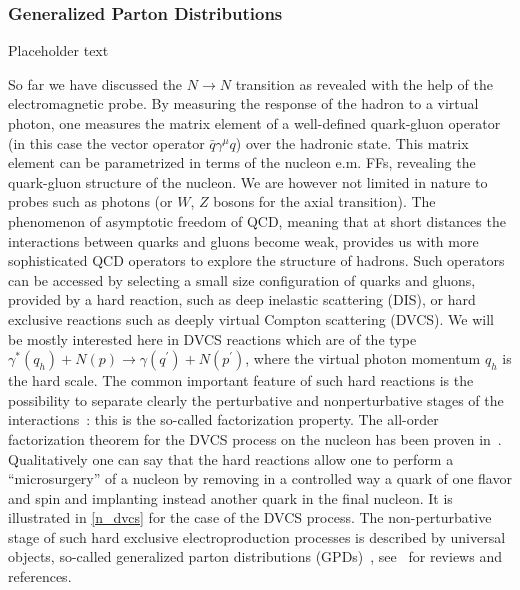 \subsubsection{Generalized Parton Distributions}
\label{subsubsec:gpd}


Placeholder text


So far we have discussed the $N \to N$ transition 
as revealed with the help of the electromagnetic probe. By measuring 
the response of the hadron to a virtual photon, one measures the matrix 
element of a  well-defined quark-gluon operator (in this case the vector 
operator $\bar q \gamma^\mu q$) over the hadronic state. This matrix element  
can be parametrized in terms of the nucleon e.m. FFs, 
revealing the quark-gluon structure of the nucleon. 
We are however not limited in nature to probes such as photons 
(or $W$, $Z$ bosons for the axial transition). The phenomenon of asymptotic 
freedom of QCD, meaning that at short distances the interactions between 
quarks and gluons become weak, provides us with more sophisticated 
QCD operators to explore the structure of hadrons. Such operators can 
be accessed by selecting a small size configuration of quarks and gluons, 
provided by a hard reaction, such as deep inelastic scattering (DIS), or 
hard exclusive reactions such as deeply virtual Compton scattering (DVCS).  
We will be mostly interested here in DVCS reactions which are of the type 
$\gamma^*(q_h) + N(p) \to \gamma(q^\prime) + N(p^\prime)$, where the 
virtual photon momentum $q_h$ is the hard scale. 
The common important feature of such hard reactions is the possibility
to separate clearly the perturbative and nonperturbative stages of
the interactions~: this is the so-called factorization property. 
\newline
\indent
The all-order factorization theorem for the DVCS process on the 
nucleon has been proven in~\cite{Ji98a,Col99,rady}.
Qualitatively one can say that the hard reactions allow
one to perform a ``microsurgery'' of a nucleon by removing in a
controlled way a quark of one flavor and spin and implanting
instead another quark in the final nucleon. 
It is illustrated in \ref{n_dvcs} 
for the case of the DVCS process. 
The non-perturbative stage of such hard exclusive 
electroproduction processes is described by 
universal objects, so-called generalized parton distributions 
(GPDs)~\cite{Muller:1998fv,ji,Radyushkin:1996nd}, 
see~\cite{Ji:1998pc,Goeke:2001tz,Diehl:2003ny,Belitsky:2005qn,Ji:2004gf} 
for reviews and references. 

